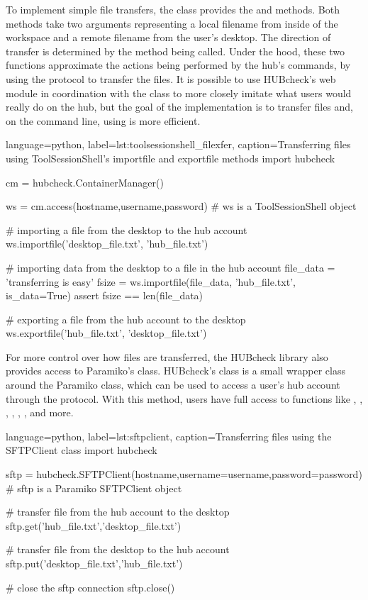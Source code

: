 To implement simple file transfers, the  class
provides the  and  methods. Both
methods take two arguments representing a local filename from inside of the
workspace and a remote filename from the user's desktop. The direction of
transfer is determined by the method being called. Under the hood, these two
functions approximate the actions being performed by the hub's
 commands, by using the  protocol to
transfer the files. It is possible to use HUBcheck's web module in coordination
with the  class to more closely imitate what users
would really do on the hub, but the goal of the implementation is to transfer
files and, on the command line, using  is more efficient.

\begin{xcode}{%
  language=python,%
  label=lst:toolsessionshell_filexfer,%
  caption={Transferring files using ToolSessionShell's importfile and exportfile methods}%
}
import hubcheck

cm = hubcheck.ContainerManager()

ws = cm.access(hostname,username,password)
# ws is a ToolSessionShell object

# importing a file from the desktop to the hub account
ws.importfile('desktop_file.txt', 'hub_file.txt')

# importing data from the desktop to a file in the hub account
file_data = 'transferring is easy'
fsize = ws.importfile(file_data, 'hub_file.txt', is_data=True)
assert fsize == len(file_data)

# exporting a file from the hub account to the desktop
ws.exportfile('hub_file.txt', 'desktop_file.txt')

\end{xcode}

For more control over how files are transferred, the HUBcheck library also
provides access to Paramiko's  class.  HUBcheck's
 class is a small wrapper class around the Paramiko
 class, which can be used to access a user's hub account
through the  protocol. With this method, users have full access
to  functions like , ,
, , , , and
more.

\begin{xcode}{%
  language=python,%
  label=lst:sftpclient,%
  caption={Transferring files using the SFTPClient class}%
}
import hubcheck

sftp = hubcheck.SFTPClient(hostname,username=username,password=password)
# sftp is a Paramiko SFTPClient object

# transfer file from the hub account to the desktop
sftp.get('hub_file.txt','desktop_file.txt')

# transfer file from the desktop to the hub account
sftp.put('desktop_file.txt','hub_file.txt')

# close the sftp connection
sftp.close()
\end{xcode}

